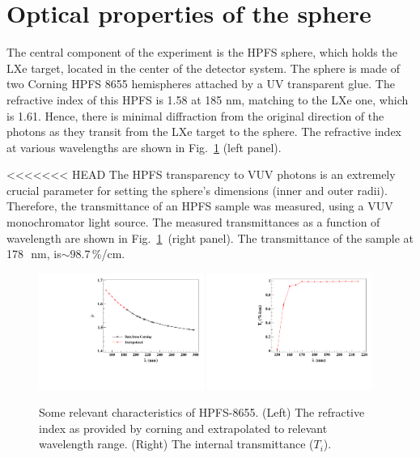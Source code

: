 \section{Optical properties of the sphere }
\label{sec:opt}


The central component of the experiment is the HPFS sphere, which holds the LXe target, located in the center of the detector system. The sphere is made of two Corning HPFS 8655 hemispheres attached by a UV transparent glue. The refractive index of this HPFS is 1.58 at 185 nm, matching to the LXe one, which is 1.61. Hence, there is minimal diffraction from the original direction of the photons as they transit from the LXe target to the sphere. The refractive index at various wavelengths are shown in Fig.~\ref{fig:hpfsRIcalibration} (left panel).


<<<<<<< HEAD
The HPFS transparency to VUV photons is an extremely crucial parameter for setting the sphere's dimensions (inner and outer radii). 
Therefore, the transmittance of an HPFS sample was measured, using a VUV monochromator light source. The measured transmittances as a function of wavelength are shown in Fig.~\ref{fig:hpfsRIcalibration}~(right panel). The transmittance of the sample at 178~\,nm, is$\sim98.7$\,\%/cm.  

\begin{figure}[h]
   \centering
   \includegraphics[width=0.48\textwidth]{RI-calibration.pdf}
    \includegraphics[width=0.48\textwidth]{IntTransmittance.pdf}
   \caption{Some relevant characteristics of HPFS-8655. (Left) The refractive index as provided by corning and 
   extrapolated to relevant wavelength range. (Right) The internal transmittance ($T_{i}$). } 
   \label{fig:hpfsRIcalibration}
\end{figure}

